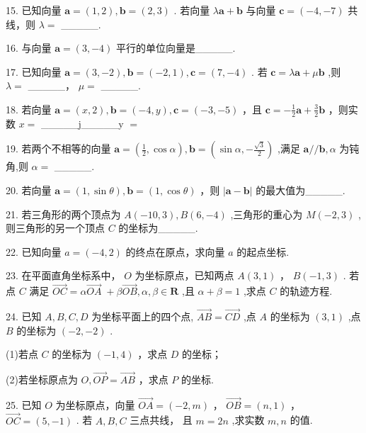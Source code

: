 \documentclass[10pt]{article}
\begin{document}
15. 已知向量 \(\mathbf{a} = \left( {1,2}\right) ,\mathbf{b} = \left( {2,3}\right)\) . 若向量 \(\lambda \mathbf{a} + \mathbf{b}\) 与向量 \(\mathbf{c} = \left( {-4, - 7}\right)\) 共线，则 \(\lambda  =\) \_\_\_\_\_.

16. 与向量 \(\mathbf{a} = \left( {3, - 4}\right)\) 平行的单位向量是\_\_\_\_\_.

17. 已知向量 \(\mathbf{a} = \left( {3, - 2}\right) ,\mathbf{b} = \left( {-2,1}\right) ,\mathbf{c} = \left( {7, - 4}\right)\) . 若 \(\mathbf{c} = \lambda \mathbf{a} + \mu \mathbf{b}\) ,则 \(\lambda  =\) \_\_\_\_\_， \(\mu  =\) \_\_\_\_\_.

18. 若向量 \(\mathbf{a} = \left( {x,2}\right) ,\mathbf{b} = \left( {-4,y}\right) ,\mathbf{c} = \left( {-3, - 5}\right)\) ，且 \(\mathbf{c} =  - \frac{1}{2}\mathbf{a} + \frac{3}{2}\mathbf{b}\) ，则实数 \(x =\) \_\_\_\_\_j\_\_\_\_\_y \(=\)

19. 若两个不相等的向量 \(\mathbf{a} = \left( {\frac{1}{2},\cos \alpha }\right) ,\mathbf{b} = \left( {\sin \alpha , - \frac{\sqrt{3}}{2}}\right)\) ,满足 \(\mathbf{a}//\mathbf{b},\alpha\) 为钝角,则 \(\alpha  =\) \_\_\_\_\_.

20. 若向量 \(\mathbf{a} = \left( {1,\sin \theta }\right) ,\mathbf{b} = \left( {1,\cos \theta }\right)\) ，则 \(\left| {\mathbf{a} - \mathbf{b}}\right|\) 的最大值为\_\_\_\_\_.

21. 若三角形的两个顶点为 \(A\left( {-{10},3}\right) ,B\left( {6, - 4}\right)\) ,三角形的重心为 \(M\left( {-2,3}\right)\) ,则三角形的另一个顶点 \(C\) 的坐标为\_\_\_\_\_.

22. 已知向量 \(a = \left( {-4,2}\right)\) 的终点在原点，求向量 \(a\) 的起点坐标.

23. 在平面直角坐标系中， \(O\) 为坐标原点，已知两点 \(A\left( {3,1}\right)\) ， \(B\left( {-1,3}\right)\) . 若点 \(C\) 满足 \(\overrightarrow{OC} = \alpha \overrightarrow{OA} \; + \beta \overrightarrow{OB},\alpha ,\beta  \in  \mathbf{R}\) ,且 \(\alpha  + \beta  = 1\) ,求点 \(C\) 的轨迹方程.

24. 已知 \(A,B,C,D\) 为坐标平面上的四个点, \(\overrightarrow{AB} = \overrightarrow{CD}\) ,点 \(A\) 的坐标为 \(\left( {3,1}\right)\) ,点 \(B\) 的坐标为 \(\left( {-2, - 2}\right)\) .

(1)若点 \(C\) 的坐标为 \(\left( {-1,4}\right)\) ，求点 \(D\) 的坐标；

(2)若坐标原点为 \(O,\overrightarrow{OP} = \overrightarrow{AB}\) ，求点 \(P\) 的坐标.

25. 已知 \(O\) 为坐标原点，向量 \(\overrightarrow{OA} = \left( {-2,m}\right)\) ， \(\overrightarrow{OB} = \left( {n,1}\right)\) ， \(\overrightarrow{OC} = \left( {5, - 1}\right)\) . 若 \(A,B,C\) 三点共线， 且 \(m = {2n}\) ,求实数 \(m,n\) 的值.
\end{document}
